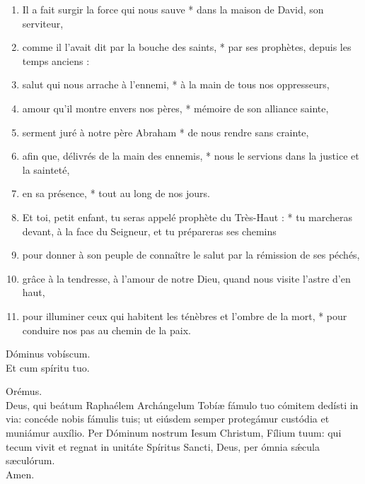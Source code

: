 \documentclass[twoside]{article}
\begin{document}
\begin{paracol}[1]{2}
\begin{enumerate}[wide, itemsep=0mm, labelwidth=!, labelindent=0pt, label=\color{gregoriocolor}\theenumi]
\item Il a fait surgir la force qui nous sauve *
dans la maison de David, son serviteur,

\item comme il l'avait dit par la bouche des saints, *
par ses prophètes, depuis les temps anciens :

\item salut qui nous arrache à l'ennemi, *
à la main de tous nos oppresseurs,

\item amour qu'il montre envers nos pères, *
mémoire de son alliance sainte,

\item serment juré à notre père Abraham *
   de nous rendre sans crainte,

\item afin que, délivrés de la main des ennemis, *
 nous le servions dans la justice et la sainteté,
 
\item en sa présence, * tout au long de nos jours.

\item Et toi, petit enfant, tu seras appelé
   prophète du Très-Haut : *
tu marcheras devant, à la face du Seigneur,
   et tu prépareras ses chemins

\item pour donner à son peuple de connaître le salut
par la rémission de ses péchés,

\item grâce à la tendresse, à l'amour de notre Dieu,
quand nous visite l'astre d'en haut,

\item pour illuminer ceux qui habitent les ténèbres
   et l'ombre de la mort, *
pour conduire nos pas
   au chemin de la paix.
\end{enumerate}

\newpage

\switchcolumn*

\vv Dóminus vobíscum. \\
\rr Et cum spíritu tuo.

Orémus.\\
Deus, qui beátum Raphaélem Archángelum Tobíæ fámulo tuo cómitem dedísti in via: concéde nobis fámulis tuis; ut eiúsdem semper protegámur custódia et muniámur auxílio.
Per Dóminum nostrum Iesum Christum, Fílium tuum: qui tecum vivit et regnat in unitáte Spíritus Sancti, Deus, per ómnia sǽcula sæculórum. \\
\rr Amen.


\end{paracol}
\end{document}
